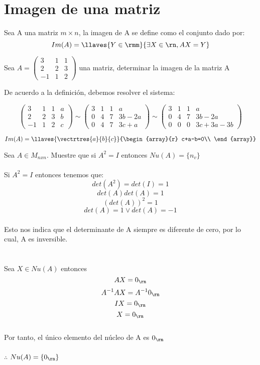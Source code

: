 \newpage
\section{Imagen de una matriz}
\begin{dfn}
Sea A una matriz $m\times n$, la imagen de A se define como el conjunto dado por:
~\\
\[Im(A)=\llaves{Y \in \rmm }{\exists X \in \rn,   AX=Y}\]
\end{dfn}


\begin{ejemplo}
Sea $A=
\left(
\begin{array}{rrr}
3&1&1\\
2&2&3\\
-1&1&2
\end{array}
\right)$ una matriz, determinar la imagen de la matriz A
 
De acuerdo a la definición, debemos resolver el sistema:

\[
\left(
\begin{array}{rrr|r}
3&1&1&a\\
2&2&3&b\\
-1&1&2&c
\end{array}
\right)
\sim
\left(
\begin{array}{rrr|r}
3&1&1&a\\
0&4&7&3b-2a\\
0&4&7&3c+a
\end{array}
\right)
\sim
\left(
\begin{array}{rrr|r}
3&1&1&a\\
0&4&7&3b-2a\\
0&0&0&3c+3a-3b
\end{array}
\right)
\]

\[Im(A)=\llaves{\vectrtres{a}{b}{c}}
{\begin{array}{r}
c+a-b=0\\
\end{array}}
\]

\end{ejemplo}

\begin{ejercicio}

Sea $A \in M_{nxn} $. Muestre que si $A^2=I$ entonces $Nu(A)=\{n_v\}$
~\\
\sol
~\\
Si $A^2=I$  entonces tenemos que:~\\
\[det(A^2)=det(I)=1\]
\[det(A)det(A)=1\]
\[(det(A))^2=1\]
\[det(A)=1 \vee det(A)=-1\]
~\\
Esto nos indica que el determinante de A siempre es diferente de cero, por lo cual, A es inversible.~\\
~\\
~\\
Sea $X\in Nu(A)$ entonces 
\[AX=0_{\rn}\]
\[A^{-1}AX=A^{-1} 0_{\rn}\]
\[IX=0_{\rn}\]
\[X=0_{\rn}\]
~\\
Por tanto, el único elemento del núcleo de A es $0_{\rn}$
~\\
~\\
$\therefore$ $Nu(A)=\lbrace 0_{\rn} \rbrace$

\end{ejercicio}

